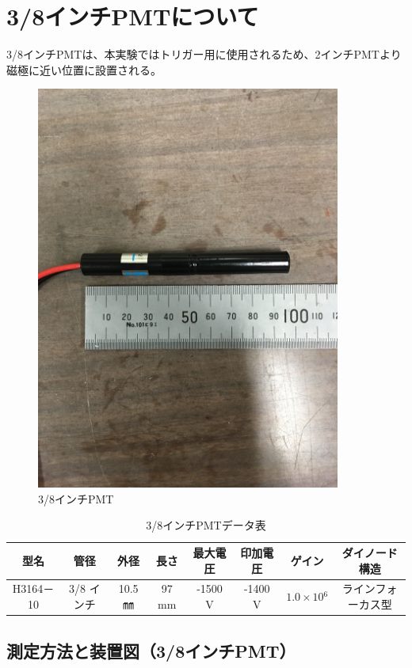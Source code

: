 \section{3/8インチPMTについて}
3/8インチPMTは、本実験ではトリガー用に使用されるため、2インチPMTより磁極に近い位置に設置される。
\begin{figure}[H]
	\centering
		\includegraphics[width=10cm]{fig/iguchi/miniPMT.jpg}
	\caption{3/8インチPMT}
	\label{3/8inch}
\end{figure}
\begin{table}[htb]
	\begin{center}
	
	  \begin{tabular}{|c|c|c|c|c|c|c|c|} \hline
		型名& 管径 & 外径 & 長さ & 最大電圧 & 印加電圧 & ゲイン & ダイノード構造 \\ \hline \hline
		H3164－10 & 3/8 インチ & 10.5 ㎜ & 97 mm & -1500 V & -1400 V & $1.0\times10{^{6}}$ &ラインフォーカス型 \\ \hline
	\end{tabular}
	  \caption{3/8インチPMTデータ表}
	\end{center}
\end{table}


\subsection{測定方法と装置図（3/8インチPMT）}

